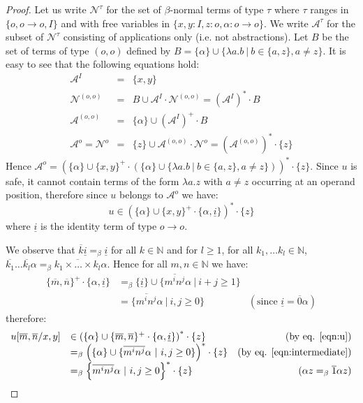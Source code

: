 \documentclass{llncs}
\newcommand{\encode}[1]{\overline{#1}} \newcommand\dps{\displaystyle}
\newcommand\union{\cup}
\newcommand\nat{\mathbb{N}}
\begin{document}
\begin{proof}
Let us write $\mathcal{N}^\tau$ for the set of $\beta$-normal terms of
type $\tau$ where $\tau$ ranges in $\{ o, o\rightarrow o, I \}$ and
with free variables in $\{ x,y:I, z:o, \alpha:o\rightarrow o\}$. We
write $\mathcal{A}^\tau$ for the subset of $\mathcal{N}^\tau$
consisting of applications only (i.e. not abstractions).
Let $B$ be the set of terms of type $(o,o)$ defined by $B = \{ \alpha \} \union \{ \lambda a.b \ | \ b \in \{a,z\}, a \neq z \}$.
It is easy to see that the following equations hold:
\begin{eqnarray*}
\mathcal{A}^I &=& \{ x,y \} \\
\mathcal{N}^{(o,o)} &=& B \union \mathcal{A}^I \cdot
\mathcal{N}^{(o,o)} = (\mathcal{A}^I)^* \cdot B \\
\mathcal{A}^{(o,o)} &=& \{ \alpha \} \union (\mathcal{A}^I)^+ \cdot B \\
\mathcal{A}^o = \mathcal{N}^o &=& \{ z \} \union \mathcal{A}^{(o,o)} \cdot \mathcal{N}^o = (\mathcal{A}^{(o,o)})^* \cdot \{ z \}
\end{eqnarray*}
Hence $\mathcal{A}^o = \left( \{\alpha \} \union \{x,y\}^+ \cdot \left( \{\alpha \} \union \{\lambda a.b \ | \ b \in \{a,z\}, a \neq z \} \right) \right)^* \cdot \{ z \}$.
Since $u$ is safe, it cannot contain terms of the form $\lambda a . z$ with $a \neq z$ occurring at an operand position, therefore since $u$ belongs to $\mathcal{A}^o$ we have:
\begin{equation}
u \in \left( \{\alpha\} \union \{x,y\}^+ \cdot \{\alpha,
\underline{i} \} \right)^* \cdot \{ z \} \label{eqn:u}
\end{equation}
where $\underline{i}$ is the identity term of type $o\rightarrow o$.


We observe that $\encode{k} \underline{i} =_\beta \underline{i}$ for all $k \in \nat$ and for $l\geq 1$, for all $k_1, \ldots k_l \in \nat$,
$\encode{k_1}\ldots \encode{k_l} \alpha =_\beta
\encode{k_1\times \ldots \times k_l} \alpha$. Hence for all $m,n \in \nat$ we have:
\begin{equation}
\begin{array}{llr}
\{\encode{m},\encode{n}\}^+ \cdot \{\alpha, \underline{i} \} &=_\beta
\{ \underline{i} \} \union
\{ \encode{m^i n^j} \alpha \ |\ i+j \geq 1 \} \nonumber \\
&= \{ \encode{m^i n^j} \alpha \ |\ i,j \geq 0 \} & ( \mbox{since } \underline{i} = \encode{0} \alpha) \end{array}
\label{eqn:intermediate}
\end{equation}
therefore:
$$\begin{array}{llr}
u[\encode{m}, \encode{n}/x,y] &\in \left( \{ \alpha \} \union \{\encode{m},\encode{n}\}^+ \cdot \{\alpha, \underline{i} \} \right)^* \cdot \{ z \}  & \mbox{(by eq. \ref{eqn:u})} \\
&=_\beta \left( \{\alpha \} \union \{ \encode{m^i n^j}
\alpha \ | \ i,j \geq 0 \} \right)^* \cdot \{ z \} & \mbox{(by eq. \ref{eqn:intermediate})}  \\
&=_\beta \left\{ \encode{m^i n^j}
\alpha \ | \ i,j \geq 0 \right\}^* \cdot \{ z \} & \mbox{($\alpha z =_\beta \encode{1} \alpha z$)}
\end{array}$$


\end{proof}
\end{document}
